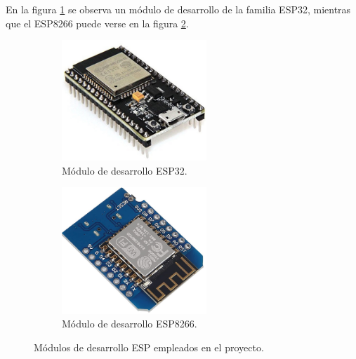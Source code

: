 En la figura \ref{fig:esp32} se observa un módulo de desarrollo de la familia ESP32, mientras que el ESP8266 puede verse en la figura \ref{fig:esp8266}. 


\begin{figure}[!htpb]
     \centering
     \begin{subfigure}[b]{0.45\textwidth}
		\centering
		\includegraphics[width=0.60\textwidth]{./Figures/esp32.jpg}
		\caption[Módulo de desarrollo ESP32]{Módulo de desarrollo ESP32.}
		\label{fig:esp32}
     \end{subfigure}
     \hfill
     \begin{subfigure}[b]{0.45\textwidth}
	\centering
		\includegraphics[width=0.60\textwidth]{./Figures/esp8266_2.jpg}
		\caption[Módulo de desarrollo ESP8266]{Módulo de desarrollo ESP8266.}
		\label{fig:esp8266}
     \end{subfigure}
     \hfill
        \caption[Módulos de desarrollo ESP empleados en el proyecto]{Módulos de desarrollo ESP empleados en el proyecto.}
        \label{fig:microESP}
\end{figure}





%


